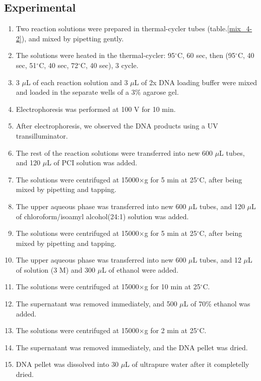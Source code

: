 \documentclass{ltjsarticle}
\theoremstyle{definition}
\numberwithin{equation}{section}
\newcommand{\D}{^\circ\text{C}}
\begin{document}
\subsection{Experimental}
\begin{enumerate}
\item Two reaction solutions were prepared in thermal-cycler tubes (table.\ref{mix_4-2}), and mixed by pipetting gently.
\item The solutions were heated in the thermal-cycler: 95$\D$, 60 sec, then (95$\D$, 40 sec, 51$\D$, 40 sec, 72$\D$, 40 sec), 3 cycle.
\item 3 $\mu$L of each reaction solution and 3 $\mu$L of 2x DNA loading buffer were mixed and loaded in the separate wells of a 3\% agarose gel.
\item Electrophoresis was performed at 100 V for 10 min.
\item After electrophoresis, we observed the DNA products using a UV transilluminator.
\item The rest of the reaction solutions were transferred into new 600 $\mu$L tubes, and 120 $\mu$L of PCI solution was added.
\item The solutions were centrifuged at 15000$\times$g for 5 min at 25$\D$, after being mixed by pipetting and tapping.
\item The upper aqueous phase was transferred into new 600 $\mu$L tubes, and 120 $\mu$L of chloroform/isoamyl alcohol(24:1) solution was added.
\item The solutions were centrifuged at 15000$\times$g for 5 min at 25$\D$, after being mixed by pipetting and tapping.
\item The upper aqueous phase was transferred into new 600 $\mu$L tubes, and 12 $\mu$L of  solution (3 M) and 300 $\mu$L of ethanol were added.
\item The solutions were centrifuged at 15000$\times$g for 10 min at 25$\D$.
\item The supernatant was removed immediately, and 500 $\mu$L of 70\% ethanol was added.
\item The solutions were centrifuged at 15000$\times$g for 2 min at 25$\D$.
\item The supernatant was removed immediately, and the DNA pellet was dried.
\item DNA pellet was dissolved into 30 $\mu$L of ultrapure water after it completelly dried.
\end{enumerate}
\end{document}
